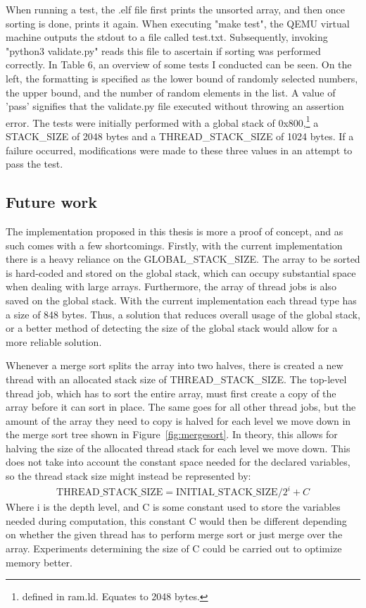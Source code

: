 When running a test, the .elf file first prints the unsorted array, and then once
sorting is done, prints it again. When executing "make test", the QEMU
virtual machine outputs the stdout to a file called test.txt. Subsequently,
invoking "python3 validate.py" reads this file to ascertain if sorting was
performed correctly. In Table 6, an overview of some tests I conducted can be
seen. On the left, the formatting is specified as the lower bound of randomly
selected numbers, the upper bound, and the number of random elements in the
list. A value of 'pass' signifies that the validate.py file executed without
throwing an assertion error. The tests were initially performed with a global
stack of 0x800,\footnote{defined in ram.ld. Equates to 2048 bytes.} a
STACK\_SIZE of 2048 bytes and a THREAD\_STACK\_SIZE of 1024 bytes. If a failure occurred,
modifications were made to these three values in an attempt to pass the test.

\subsection{Future work}
The implementation proposed in this thesis is more a proof of concept, and as
such comes with a few shortcomings. Firstly, with the current implementation
there is a heavy reliance on the GLOBAL\_STACK\_SIZE. The array to be sorted is
hard-coded and stored on the global stack, which can occupy substantial space
when dealing with large arrays. Furthermore, the array of thread jobs is also
saved on the global stack. With the current implementation each thread type has
a size of 848 bytes. Thus, a solution that reduces overall usage of the global
stack, or a better method of detecting the size of the global stack would allow
for a more reliable solution.

Whenever a merge sort splits the array into two halves, there is created a new
thread with an allocated stack size of THREAD\_STACK\_SIZE. The top-level thread
job, which has to sort the entire array, must first create a copy of the array
before it can sort in place. The same goes for all other thread jobs, but the
amount of the array they need to copy is halved for each level we move down in
the merge sort tree shown in Figure~\ref{fig:mergesort}. In theory, this allows
for halving the size of the allocated thread stack for each level we move down.
This does not take into account the constant space needed for the declared
variables, so the thread stack size might instead be represented by:
\begin{align}
  \text{THREAD\_STACK\_SIZE} = \text{INITIAL\_STACK\_SIZE} / 2^i + C
\end{align}
Where i is the depth level, and C is some constant used to store the variables
needed during computation, this constant C would then be different depending on
whether the given thread has to perform merge sort or just merge over the array.
Experiments determining the size of C could be carried out to optimize
memory better.

